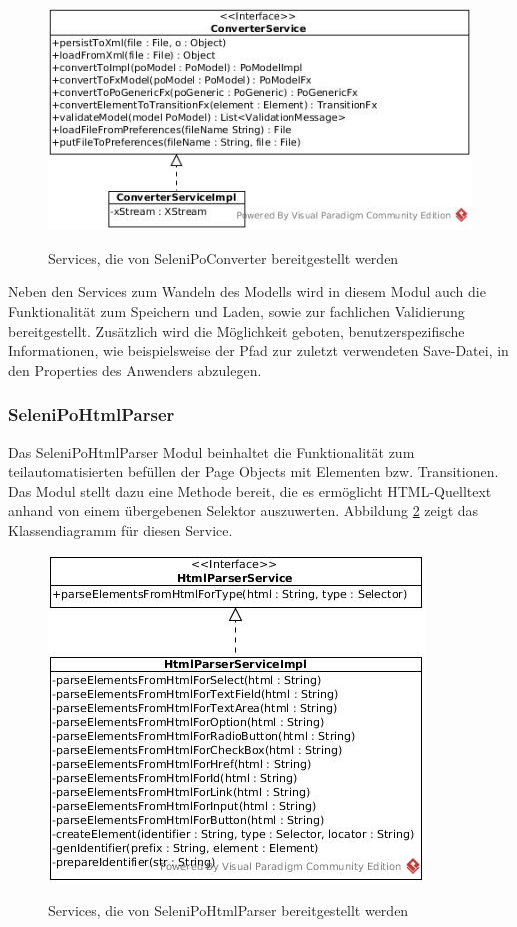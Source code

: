 \begin{figure}[htb]
  \centering  
  \includegraphics[scale=0.5]{img/ConverterService.jpg}\\
  \caption{Services, die von SeleniPoConverter bereitgestellt werden}
  \label{fig:converter_service}
\end{figure}

Neben den Services zum Wandeln des Modells wird in diesem Modul auch die Funktionalität zum Speichern und Laden, sowie zur fachlichen Validierung bereitgestellt.
Zusätzlich wird die Möglichkeit geboten, benutzerspezifische Informationen, wie beispielsweise der Pfad zur zuletzt verwendeten Save-Datei, in den Properties des Anwenders abzulegen.


\subsubsection{SeleniPoHtmlParser}
\label{sec:selenipohtmlparser}

Das SeleniPoHtmlParser Modul beinhaltet die Funktionalität zum teilautomatisierten befüllen der Page Objects mit Elementen bzw. Transitionen.
Das Modul stellt dazu eine Methode bereit, die es ermöglicht HTML-Quelltext anhand von einem übergebenen Selektor auszuwerten.
Abbildung \ref{fig:html_service} zeigt das Klassendiagramm für diesen Service.

\begin{figure}[htb]
  \centering  
  \includegraphics[scale=0.5]{img/HtmlParserService.jpg}\\
  \caption{Services, die von SeleniPoHtmlParser bereitgestellt werden}
  \label{fig:html_service}
\end{figure}

